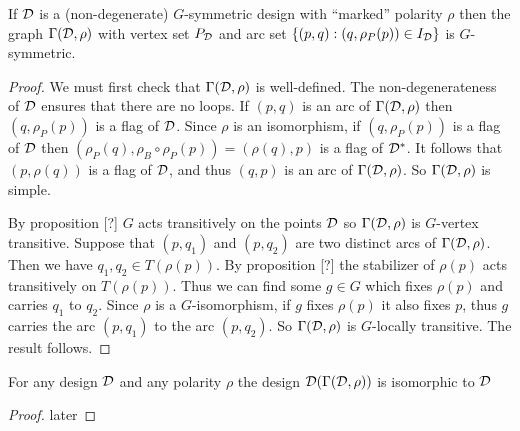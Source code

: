 \begin{proposition}
If $\mathcal{D}$ is a (non-degenerate) $G$-symmetric design with ``marked'' polarity $\rho$
then the graph $\Gamma(\mathcal{D}, \rho)$ with vertex set $P_{\mathcal{D}}$
and arc set $\{ (p,q) : (q,\rho_P(p)) \in I_{\mathcal{D}} \}$ is $G$-symmetric.
\begin{proof}
We must first check that $\Gamma(\mathcal{D}, \rho)$ is well-defined.
The non-degenerateness of $\mathcal{D}$ ensures that there are no loops.
If $(p,q)$ is an arc of $\Gamma(\mathcal{D}, \rho)$
then $(q, \rho_P(p))$ is a flag of $\mathcal{D}$.
Since $\rho$ is an isomorphism,
if $(q, \rho_P(p))$ is a flag of $\mathcal{D}$
then $(\rho_P(q), \rho_B \circ \rho_P(p)) = (\rho(q), p)$
is a flag of $\mathcal{D}^{*}$.
It follows that $(p,\rho(q))$ is a flag of $\mathcal{D}$,
and thus $(q,p)$ is an arc of $\Gamma(\mathcal{D}, \rho)$.
So $\Gamma(\mathcal{D}, \rho)$ is simple.


By proposition [?] $G$ acts transitively on the points $\mathcal{D}$
so $\Gamma(\mathcal{D}, \rho)$ is $G$-vertex transitive.
Suppose that $(p,q_1)$ and $(p,q_2)$ are two distinct arcs of
$\Gamma(\mathcal{D}, \rho)$. Then we have $q_1, q_2 \in T(\rho(p))$.
By proposition [?]
the stabilizer of $\rho(p)$ acts transitively on $T(\rho(p))$.
Thus we can find some $g \in G$ which fixes $\rho(p)$ and
carries $q_1$ to $q_2$.
Since $\rho$ is a $G$-isomorphism, if $g$ fixes $\rho(p)$
it also fixes $p$, thus $g$ carries the arc $(p,q_1)$
to the arc $(p,q_2)$. So $\Gamma(\mathcal{D}, \rho)$ is $G$-locally
transitive. The result follows.

\end{proof}
\end{proposition}

\begin{proposition}
For any design $\mathcal{D}$ and any polarity $\rho$ the design $\mathcal{D}(\Gamma(\mathcal{D},\rho))$
is isomorphic to $\mathcal{D}$
\begin{proof}
later
\end{proof}
\end{proposition}



